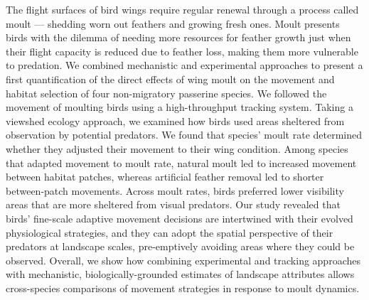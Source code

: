     The flight surfaces of bird wings require regular renewal through a process called moult --- shedding worn out feathers and growing fresh ones.
    Moult presents birds with the dilemma of needing more resources for feather growth just when their flight capacity is reduced due to feather loss, making them more vulnerable to predation.
    We combined mechanistic and experimental approaches to present a first quantification of the direct effects of wing moult on the movement and habitat selection of four non-migratory passerine species. 
    We followed the movement of moulting birds using a high-throughput tracking system. 
    Taking a viewshed ecology approach, we examined how birds used areas sheltered from observation by potential predators.
    We found that species' moult rate determined whether they adjusted their movement to their wing condition.
    Among species that adapted movement to moult rate, natural moult led to increased movement between habitat patches, whereas artificial feather removal led to shorter between-patch movements. 
    Across moult rates, birds preferred lower visibility areas that are more sheltered from visual predators.
    Our study revealed that birds' fine-scale adaptive movement decisions are intertwined with their evolved physiological strategies, and they can adopt the spatial perspective of their predators at landscape scales, pre-emptively avoiding areas where they could be observed.
    Overall, we show how combining experimental and tracking approaches with mechanistic, biologically-grounded estimates of landscape attributes allows cross-species comparisons of movement strategies in response to moult dynamics.


\clearpage
